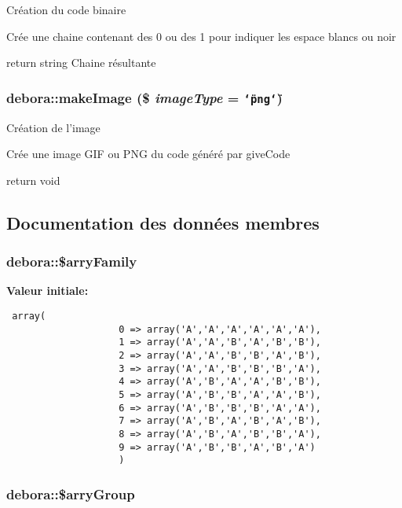 Cr\'{e}ation du code binaire

Cr\'{e}e une chaine contenant des 0 ou des 1 pour indiquer les espace blancs ou noir

return string Chaine r\'{e}sultante \hypertarget{classdebora_a2}{
\subsubsection[makeImage]{\setlength{\rightskip}{0pt plus 5cm}debora::make\-Image (\$ {\em image\-Type} = {\tt \char`\"{}png\char`\"{}})}}
\label{classdebora_a2}


Cr\'{e}ation de l'image

Cr\'{e}e une image GIF ou PNG du code g\'{e}n\'{e}r\'{e} par give\-Code

return void 

\subsection{Documentation des donn\'{e}es membres}
\hypertarget{classdebora_o1}{
\subsubsection[\$arryFamily]{\setlength{\rightskip}{0pt plus 5cm}debora::\$arry\-Family}}
\label{classdebora_o1}


{\bf Valeur initiale:}

\footnotesize\begin{verbatim} array(
                    0 => array('A','A','A','A','A','A'),
                    1 => array('A','A','B','A','B','B'),
                    2 => array('A','A','B','B','A','B'),
                    3 => array('A','A','B','B','B','A'),
                    4 => array('A','B','A','A','B','B'),
                    5 => array('A','B','B','A','A','B'),
                    6 => array('A','B','B','B','A','A'),
                    7 => array('A','B','A','B','A','B'),
                    8 => array('A','B','A','B','B','A'),
                    9 => array('A','B','B','A','B','A')
                    )
\end{verbatim}\normalsize 
\hypertarget{classdebora_o0}{
\subsubsection[\$arryGroup]{\setlength{\rightskip}{0pt plus 5cm}debora::\$arry\-Group}}
\label{classdebora_o0}


